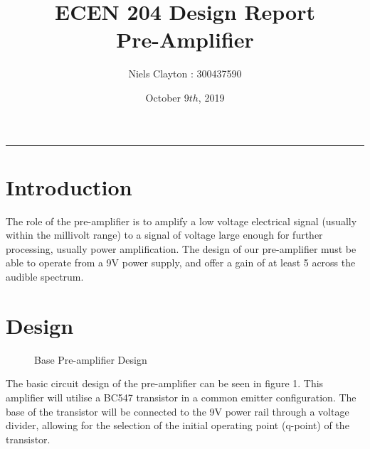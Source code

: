 \documentclass[a4paper,11pt]{article}
\begin{document}
\title{\LARGE{\textbf{ECEN 204 Design Report}\\Pre-Amplifier}}
\author{Niels Clayton : 300437590}
\date{October 9$th$, 2019}
\maketitle
\hrule

\section{Introduction}

The role of the pre-amplifier is to amplify a low voltage electrical signal (usually within the millivolt range) to a signal of voltage large enough for further processing, usually power amplification.  The design of our pre-amplifier must be able to operate from a 9V power supply, and offer a gain of at least 5 across the audible spectrum. 

\section{Design}

\begin{figure}
\vspace{-40pt}
\begin{center}
\end{center}
\vspace{-18pt}
\caption{Base Pre-amplifier Design}
\end{figure}

The basic circuit design of the pre-amplifier can be seen in figure 1. This amplifier will utilise a BC547 transistor in a common emitter configuration. The base of the transistor will be connected to the 9V power rail through a voltage divider, allowing for the selection of the initial operating point (q-point) of the transistor.\\\\
\end{document}
